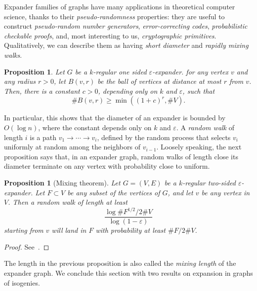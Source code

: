 \documentclass[10pt]{article}
\theoremstyle{plain}
\newtheorem{proposition}[theorem]{Proposition}
\theoremstyle{definition}
\begin{document}
Expander families of graphs have many applications in theoretical
computer science, thanks to their \emph{pseudo-randomness} properties:
they are useful to construct \emph{pseudo-random number generators},
\emph{error-correcting codes}, \emph{probabilistic checkable proofs},
and, most interesting to us, \emph{cryptographic primitives}. %
Qualitatively, we can describe them as having \emph{short diameter}
and \emph{rapidly mixing walks}.

\begin{proposition}
  Let $G$ be a $k$-regular one sided $ε$-expander. %
  for any vertex $v$ and any radius $r>0$, let $B(v,r)$ be the
  \emph{ball} of vertices at distance at most $r$ from $v$. %
  Then, there is a constant $c>0$, depending only on $k$ and $ε$, such
  that
  \[\#B(v,r)≥\min((1+c)^r,\#V).\]
\end{proposition}

In particular, this shows that the diameter of an expander is bounded
by $O(\log n)$, where the constant depends only on $k$ and $ε$. %
A \emph{random walk} of length $i$ is a path $v_1\to\cdots\to v_i$,
defined by the random process that selects $v_i$ uniformly at random
among the neighbors of $v_{i-1}$. %
Loosely speaking, the next proposition says that, in an expander
graph, random walks of length close its diameter terminate on any
vertex with probability close to uniform. %

\begin{proposition}[Mixing theorem]
  Let $G=(V,E)$ be a $k$-regular two-sided $ε$-expander. %
  Let $F⊂V$ be any subset of the vertices of $G$, and let $v$ be any
  vertex in $V$. %
  Then a random walk of length at least
  \[\frac{\log\#F^{1/2}/2\#V}{\log(1-ε)}\] %
  starting from $v$ will land in $F$ with probability at least
  $\#F/2\#V$.
\end{proposition}
\begin{proof}
  See~\cite{JMV}.
\end{proof}

The length in the previous proposition is also called the \emph{mixing
  length} of the expander graph. %
We conclude this section with two results on expansion in graphs of
isogenies.
\end{document}
